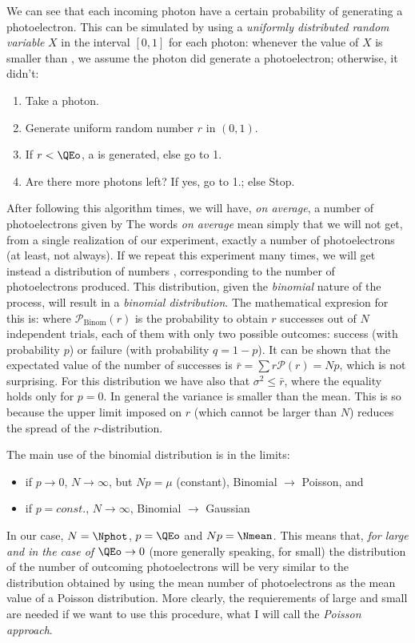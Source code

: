\noutphotfig

We can see that each incoming photon have a certain probability \QEo
of generating a photoelectron. This can be simulated by using a
\emph{uniformly distributed random variable} $X$ in the interval
$[0,1]$ for each photon: whenever the value of $X$ is smaller than
\QEo, we assume the photon did generate a photoelectron; otherwise, it
didn't:
%
\begin{enumerate}
\item Take a photon.
\item Generate uniform random number $r$ in $(0,1)$.
\item If $r < \QEo$, a \phe is generated, else go to 1.
\item Are there more photons left? If yes, go to 1.; else Stop.
\end{enumerate}
%
After following this algorithm \Nphot times, we will have, \emph{on
  average}, a number of photoelectrons given by
%
\nmeaneq
%
The words \emph{on average} mean simply that we will not get, from a
single realization of our experiment, exactly a number \Nmean of
photoelectrons (at least, not always). If we repeat this experiment
many times, we will get instead a distribution of numbers \Ntrial,
corresponding to the number of photoelectrons produced. This
distribution, given the \emph{binomial} nature of the process, will
result in a \emph{binomial distribution}. The mathematical expresion
for this is:
%
\binomeq
%
where $\mathcal{P}_{\mathrm{Binom}}(r)$ is the probability to obtain
$r$ successes out of $N$ independent trials, each of them with only
two possible outcomes: success (with probability $p$) or failure (with
probability $q=1-p$). It can be shown that the expectated value of the
number of successes is $\bar{r}=\sum r\mathcal{P}(r) = N p$, which is
not surprising. For this distribution we have also that $\sigma^{2}
\leq \bar{r}$, where the equality holds only for $p=0$. In general the
variance is smaller than the mean. This is so because the upper limit
imposed on $r$ (which cannot be larger than $N$) reduces the spread of
the $r$-distribution.

\varquotfig

\noutqesmallfig

The main use of the binomial distribution is in the limits:
%
\begin{itemize}
\item if $p\to 0$, $N\to\infty$, but $Np=\mu$ (constant),
  Binomial $\longrightarrow$ Poisson, and
\item if $p=const.$, $N\to\infty$, Binomial $\longrightarrow$
  Gaussian
\end{itemize}
%
In our case, $N=\Nphot$, $p=\QEo$ and $Np=\Nmean$.  This means that,
\emph{for \Nphot large and in the case of $\QEo\to 0$} (more
generally speaking, for \QEo small) the distribution of the number of
outcoming photoelectrons \Ntrial will be very similar to the
distribution obtained by using the mean number of photoelectrons
\Nmean as the mean value of a Poisson distribution. More clearly, the
requierements of \Nphot large and \QEo small are needed if we want to
use this procedure, what I will call the \emph{Poisson approach}.


